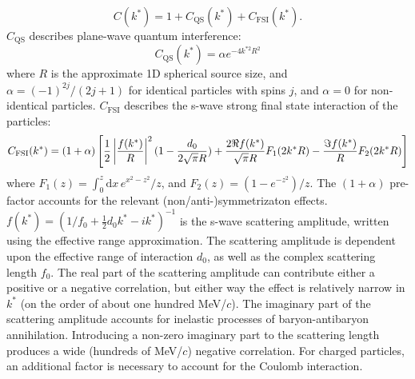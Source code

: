 \begin{equation}
\label{eq:GeneralCorrelationFunction}
C(k^*)= 1 + C_{\mathrm{QS}}(k^*)+C_{\mathrm{FSI}}(k^*).
\end{equation}
$C_{\mathrm{QS}}$ describes plane-wave quantum interference:
\begin{equation}
C_{\mathrm{QS}}(k^*) = \alpha e^{-4k^{*2}R^2}
\end{equation}
where $R$ is the approximate 1D spherical source size, and $\alpha = (-1)^{2j}/(2j+1)$ for identical particles with spins $j$, and $\alpha = 0$ for non-identical particles.
$C_{\mathrm{FSI}}$ describes the s-wave strong final state interaction of the particles:
\begin{equation}
\label{eq:Lednicky}
C_{\mathrm{FSI}}(k^*)= (1+\alpha)\left[\frac{1}{2}\left\lvert\frac{f(k^*)}{R}\right\rvert^2(1-\frac{d_0}{2\sqrt{\pi}R})+\frac{2\Re f(k^*)}{\sqrt{\pi}R}F_1(2k^*R)-\frac{\Im f(k^*)}{R}F_2(2k^*R)\right]
\end{equation}
where $F_1(z) = \int_0^z \! \mathrm{d}x \, e^{x^2-z^2}/z$, and $F_2(z) = (1-e^{-z^2})/z$.
The $(1+\alpha)$ pre-factor accounts for the relevant (non/anti-)symmetrizaton effects.
$f(k^*)=(1/f_0+\frac{1}{2}d_0k^*-ik^*)^{-1}$ is the s-wave scattering amplitude, written using the effective range approximation.
The scattering amplitude is dependent upon the effective range of interaction $d_0$, as well as the complex scattering length $f_0$.  
The real part of the scattering amplitude can contribute either a positive or a negative correlation, but either way the effect is relatively narrow in $k^*$ (on the order of about one hundred MeV/$c$).  
The imaginary part of the scattering amplitude accounts for inelastic processes of baryon-antibaryon annihilation.  
Introducing a non-zero imaginary part to the scattering length produces a wide (hundreds of MeV/$c$) negative correlation.  
For charged particles, an additional factor \cite{Aamodt:2011kd} is necessary to account for the Coulomb interaction.

